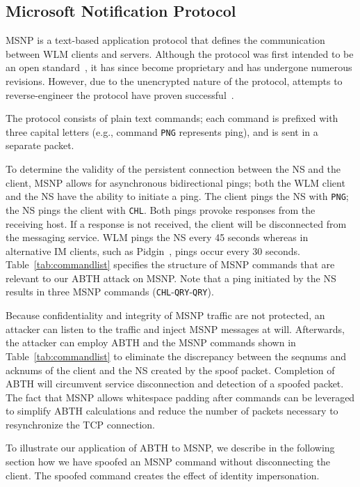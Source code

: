 \documentclass{sig-alternate}
\begin{document}
\subsection{Microsoft Notification Protocol}

MSNP is a text-based application protocol that defines the communication between WLM clients and servers.
Although the protocol was first intended to be an open standard~\cite{fout:insidewlm}, it has since become proprietary and has undergone numerous revisions.
However, due to the unencrypted nature of the protocol, attempts to reverse-engineer the protocol have proven successful~\cite{hypothetic:msnp, msnfanatic:msnp}.

The protocol consists of plain text commands; each command is prefixed with three capital letters (e.g., command \texttt{PNG} represents ping), and is sent in a separate packet.

To determine the validity of the persistent connection between the NS and the client, MSNP allows for asynchronous bidirectional pings; both the WLM client and the NS have the ability to initiate a ping.
The client pings the NS with \texttt{PNG}; the NS pings the client with \texttt{CHL}.
Both pings provoke responses from the receiving host. 
If a response is not received, the client will be disconnected from the messaging service.
WLM pings the NS every 45 seconds whereas in alternative IM clients, such as Pidgin~\cite{pidgin:url}, pings occur every 30 seconds.
Table~\ref{tab:commandlist} specifies the structure of MSNP commands that are relevant to our ABTH attack on MSNP.
Note that a ping initiated by the NS results in three MSNP commands (\texttt{CHL}-\texttt{QRY}-\texttt{QRY}).

Because confidentiality and integrity of MSNP traffic are not protected, an attacker can listen to the traffic and inject MSNP messages at will.
Afterwards, the attacker can employ ABTH and the MSNP commands shown in Table~\ref{tab:commandlist} to eliminate the discrepancy between the seqnums and acknums of the client and the NS created by the spoof packet.
Completion of ABTH will circumvent service disconnection and detection of a spoofed packet.
The fact that MSNP allows whitespace padding after commands can be leveraged to simplify ABTH calculations and reduce the number of packets necessary to resynchronize the TCP connection.

To illustrate our application of ABTH to MSNP, we describe in the following section how we have spoofed an MSNP command without disconnecting the client.
The spoofed command creates the effect of identity impersonation.
\end{document}
